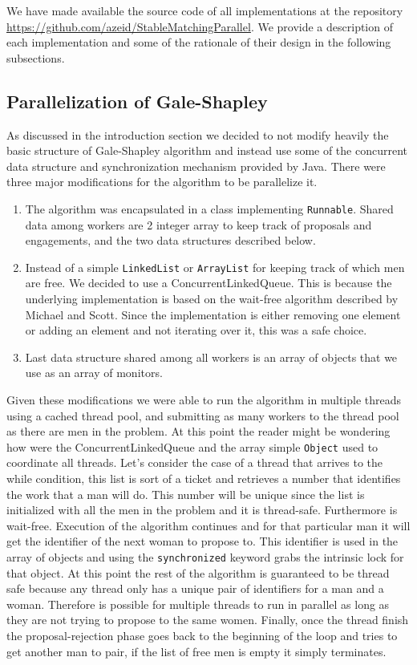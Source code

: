 We have made available the source code of all implementations at the repository \url{https://github.com/azeid/StableMatchingParallel}. We provide a description of each implementation and some of the rationale of their design in the following subsections.

\subsection{Parallelization of Gale-Shapley}

As discussed in the introduction section we decided to not modify heavily the basic structure of Gale-Shapley algorithm and instead use some of the concurrent data structure and synchronization mechanism provided by Java. There were three major modifications for the algorithm to be parallelize it.

\begin{enumerate}
    \item The algorithm was encapsulated in a class implementing \texttt{Runnable}. Shared data among workers are 2 integer array to keep track of proposals and engagements, and the two data structures described below.
    \item Instead of a simple \texttt{LinkedList} or \texttt{ArrayList} for keeping track of which men are free. We decided to use a ConcurrentLinkedQueue. This is because the underlying implementation is based on the wait-free algorithm described by Michael and Scott\cite{michael1995simple}. Since the implementation is either removing one element or adding an element and not iterating over it, this was a safe choice.
    \item Last data structure shared among all workers is an array of objects that we use as an array of monitors. 
\end{enumerate}

Given these modifications we were able to run the algorithm in multiple threads using a cached thread pool, and submitting as many workers to the thread pool as there are men in the problem. At this point the reader might be wondering how were the ConcurrentLinkedQueue and the array simple \texttt{Object} used to coordinate all threads.
Let's consider the case of a thread that arrives to the while condition, this list is sort of a ticket and retrieves a number that identifies the work that a man will do. This number will be unique since the list is initialized with all the men in the problem and it is thread-safe. Furthermore is wait-free. Execution of the algorithm continues and for that particular man it will get the identifier of the next woman to propose to. This identifier is used in the array of objects and using the \texttt{synchronized} keyword grabs the intrinsic lock for that object. At this point the rest of the algorithm is guaranteed to be thread safe because any thread only has a unique pair of identifiers for a man and a woman. Therefore is possible for multiple threads to run in parallel as long as they are not trying to propose to the same women. Finally, once the thread finish the proposal-rejection phase goes back to the beginning of the loop and tries to get another man to pair, if the list of free men is empty it simply terminates.

